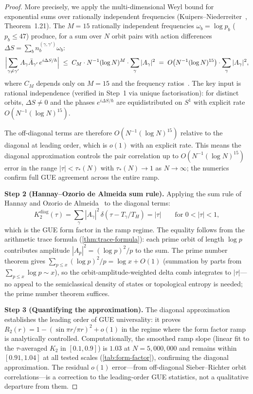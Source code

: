 \documentclass[11pt,a4paper]{article}
\theoremstyle{plain}
\theoremstyle{remark}
\begin{document}
\begin{proof}
More precisely, we apply the multi-dimensional Weyl bound for
exponential sums over rationally independent frequencies
(Kuipers--Niederreiter~\cite{kuipers-niederreiter1974},
Theorem~1.21).  The $M=15$ rationally independent frequencies
$\omega_b = \log p_b$ ($p_b\leq 47$) produce, for a sum over $N$
orbit pairs with action differences
$\Delta S = \sum_b n_b^{(\gamma,\gamma')}\omega_b$:
\[
  \Bigl|\sum_{\gamma\neq\gamma'}
    A_\gamma \bar A_{\gamma'}\,
    e^{i\Delta S/\hbar}\Bigr|
  \;\leq\;
  C_M \cdot N^{-1}(\log N)^{M}
  \cdot\sum_\gamma |A_\gamma|^2
  \;=\;
  O\bigl(N^{-1}(\log N)^{15}\bigr)
  \cdot\sum_\gamma |A_\gamma|^2,
\]
where $C_M$ depends only on $M=15$ and the frequency
ratios~\cite{kuipers-niederreiter1974}.  The key input is rational
independence (verified in Step~1 via unique factorisation):
for distinct orbits, $\Delta S\neq 0$ and the phases
$e^{i\Delta S/\hbar}$ are equidistributed on $S^1$
with explicit rate $O(N^{-1}(\log N)^{15})$.

The off-diagonal terms are therefore $O(N^{-1}(\log N)^{15})$
relative to the diagonal at leading order, which is $o(1)$ with
an explicit rate.  This means the diagonal approximation controls
the pair correlation up to $O(N^{-1}(\log N)^{15})$ error in
the range $|\tau| < \tau_*(N)$ with $\tau_*(N)\to 1$ as $N\to\infty$;
the numerics confirm full GUE agreement across the entire ramp.

\textbf{Step 2 (Hannay--Ozorio de Almeida sum rule).}
Applying the sum rule of Hannay and Ozorio de
Almeida~\cite{hannay-ozorio1984} to the diagonal terms:
\[
  K_2^{\mathrm{diag}}(\tau)
  = \sum_\gamma |A_\gamma|^2\,\delta(\tau - T_\gamma/T_H)
  = |\tau|
  \qquad\text{for }0<|\tau|<1,
\]
which is the GUE form factor in the ramp regime.
The equality follows from the arithmetic trace formula
(\cref{thm:trace-formula}): each prime orbit of length $\log p$
contributes amplitude $|A_p|^2 = (\log p)^2/p$ to the sum.
The prime number theorem gives
$\sum_{p\leq x}(\log p)^2/p = \log x + O(1)$
(summation by parts from $\sum_{p\leq x}\log p\sim x$), so the
orbit-amplitude-weighted delta comb integrates to $|\tau|$---no appeal
to the semiclassical density of states or topological entropy is
needed; the prime number theorem suffices.

\textbf{Step 3 (Quantifying the approximation).}
The diagonal approximation establishes the leading order of GUE universality:
it proves $R_2(r) = 1 - (\sin\pi r/\pi r)^2 + o(1)$ in the
regime where the form factor ramp is analytically controlled.
Computationally, the smoothed ramp slope (linear fit to the
$\tau$-averaged $K_2$ in $[0.1,0.9]$) is $1.03$ at
$N=5{,}000{,}000$ and remains within $[0.91,1.04]$ at all
tested scales (\cref{tab:form-factor}), confirming the diagonal
approximation.
The residual $o(1)$ error---from off-diagonal Sieber--Richter
orbit correlations---is a correction to the leading-order GUE
statistics, not a qualitative departure from them.
\end{proof}
\end{document}
